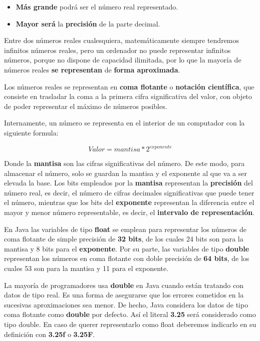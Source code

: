 \begin{itemize}
    \item \textbf{Más grande} podrá ser el número real representado.
    \item \textbf{Mayor será} la \textbf{precisión} de la parte decimal.
\end{itemize}

Entre dos números reales cualesquiera, matemáticamente siempre tendremos infinitos números reales, pero un ordenador no puede representar infinitos números, porque no dispone de capacidad ilimitada, por lo que la mayoría de números reales \textbf{se representan} de \textbf{forma aproximada}.

Los números reales se representan en \textbf{coma flotante} o \textbf{notación científica}, que consiste en trasladar la coma a la primera cifra significativa del valor, con objeto de poder representar el máximo de números posibles.

Internamente, un número se representa en el interior de un computador con la siguiente formula:

\begin{equation*}\label{key}
    Valor = mantisa*2^{exponente}
\end{equation*}

Donde la \textbf{mantisa} son las cifras significativas del número. De este modo, para almacenar el número, solo se guardan la mantisa y el exponente al que va a ser elevada la base. Los bits empleados por la \textbf{mantisa} representan la \textbf{precisión} del número real, es decir, el número de cifras decimales significativas que puede tener el número, mientras que los bits del \textbf{exponente} representan la diferencia entre el mayor y menor número representable, es decir, el \textbf{intervalo de representación}.

En Java las variables de tipo \textbf{float} se emplean para representar los números de coma flotante de simple precisión de \textbf{32 bits}, de los cuales 24 bits son para la mantisa y 8 bits para el \textbf{exponente}. Por su parte, las variables de tipo \textbf{double} representan los números en coma flotante con doble precisión de \textbf{64 bits}, de los cuales 53 son para la mantisa y 11 para el exponente.

La mayoría de programadores usa \textbf{double} en Java cuando están tratando con datos de tipo real. Es una forma de asegurarse que los errores cometidos en la sucesivas aproximaciones sea menor. De hecho, Java considera los datos de tipo coma flotante como \textbf{double} por defecto. Así el literal \textbf{3.25} será considerado como tipo double. En caso de querer representarlo como float deberemos indicarlo en su definición con \textbf{3.25f} o \textbf{3.25F}.

